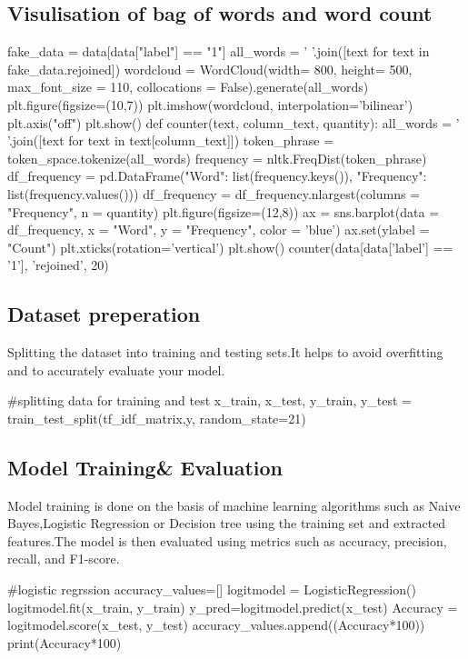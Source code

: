 \documentclass{josis}
\begin{document}
{{\subsection{Visulisation of bag of words and word count}
\begin{python}
fake_data = data[data["label"] == "1"]
all_words = ' '.join([text for text in fake_data.rejoined])
wordcloud = WordCloud(width= 800, height= 500,
                          max_font_size = 110,
                          collocations = False).generate(all_words)
plt.figure(figsize=(10,7))
plt.imshow(wordcloud, interpolation='bilinear')
plt.axis("off")
plt.show()
def counter(text, column_text, quantity):
    all_words = ' '.join([text for text in text[column_text]])
    token_phrase = token_space.tokenize(all_words)
    frequency = nltk.FreqDist(token_phrase)
    df_frequency = pd.DataFrame({"Word": list(frequency.keys()),
                                   "Frequency": list(frequency.values())})
    df_frequency = df_frequency.nlargest(columns = "Frequency", n = quantity)
    plt.figure(figsize=(12,8))
    ax = sns.barplot(data = df_frequency, x = "Word", y = "Frequency", color = 'blue')
    ax.set(ylabel = "Count")
    plt.xticks(rotation='vertical')
    plt.show()
    counter(data[data['label'] == '1'], 'rejoined', 20)
\end{python}
\subsection{Dataset preperation}
Splitting the dataset into training and testing sets.It helps to avoid overfitting and to accurately evaluate your model.  
\begin{python}
#splitting data for training and test
x_train, x_test, y_train, y_test = train_test_split(tf_idf_matrix,y, random_state=21)
\end{python}
\subsection{Model Training\& Evaluation}
Model training is done on the basis of machine learning algorithms such as Naive Bayes,Logistic Regression or Decision tree using the training set and extracted features.The model is then evaluated using metrics such as accuracy, precision, recall, and F1-score.
\begin{python}
#logistic regrssion
accuracy_values=[]
logitmodel = LogisticRegression()
logitmodel.fit(x_train, y_train)
y_pred=logitmodel.predict(x_test)
Accuracy = logitmodel.score(x_test, y_test)
accuracy_values.append((Accuracy*100))
print(Accuracy*100)
 

\end{python}}}
\end{document}
